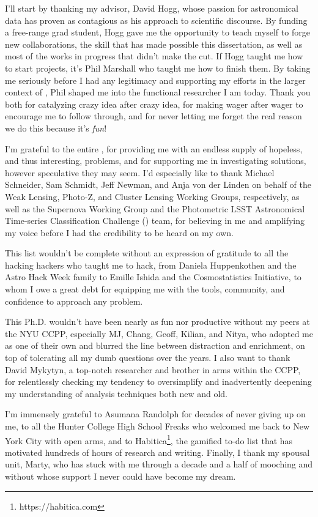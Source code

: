 I'll start by thanking my advisor, David Hogg, whose passion for astronomical data has proven as contagious as his approach to scientific discourse.
By funding a free-range grad student, Hogg gave me the opportunity to teach myself to forge new collaborations, the skill that has made possible this dissertation, as well as most of the works in progress that didn't make the cut.
If Hogg taught me how to start projects, it's Phil Marshall who taught me how to finish them.
By taking me seriously before I had any legitimacy and supporting my efforts in the larger context of \desc, Phil shaped me into the functional researcher I am today.
Thank you both for catalyzing crazy idea after crazy idea, for making wager after wager to encourage me to follow through, and for never letting me forget the real reason we do this \textemdash because it's \textit{fun}!

I'm grateful to the entire \desc, for providing me with an endless supply of hopeless, and thus interesting, problems, and for supporting me in investigating solutions, however speculative they may seem. 
I'd especially like to thank Michael Schneider, Sam Schmidt, Jeff Newman, and Anja von der Linden on behalf of the Weak Lensing, Photo-Z, and Cluster Lensing Working Groups, respectively, as well as the Supernova Working Group and the Photometric LSST Astronomical Time-series Classification Challenge () team, for believing in me and amplifying my voice before I had the credibility to be heard on my own.

This list wouldn't be complete without an expression of gratitude to all the hacking hackers who taught me to hack, from Daniela Huppenkothen and the Astro Hack Week family to Emille Ishida and the Cosmostatistics Initiative, to whom I owe a great debt for equipping me with the tools, community, and confidence to approach any problem.


This Ph.D. wouldn't have been nearly as fun nor productive without my peers at the NYU CCPP, especially MJ, Chang, Geoff, Kilian, and Nitya, who adopted me as one of their own and blurred the line between distraction and enrichment, on top of tolerating all my dumb questions over the years.
I also want to thank David Mykytyn, a top-notch researcher and brother in arms within the CCPP, for relentlessly checking my tendency to oversimplify and inadvertently deepening my understanding of analysis techniques both new and old.

I'm immensely grateful to Asumana Randolph for decades of never giving up on me, to all the Hunter College High School Freaks who welcomed me back to New York City with open arms, and to Habitica\footnote{https://habitica.com}, the gamified to-do list that has motivated hundreds of hours of research and writing.
Finally, I thank my spousal unit, Marty, who has stuck with me through a decade and a half of mooching and without whose support I never could have become my dream.